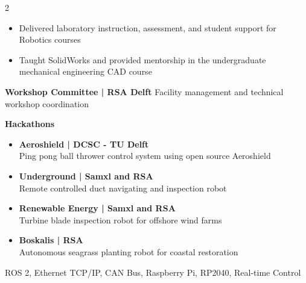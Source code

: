 \documentclass[9pt, a4paper, withhyper, normalphoto]{altacv}
\begin{document}
\begin{paracol}{2}
    \medskip
    \divider
    
      \begin{itemize}
          \item Delivered laboratory instruction, assessment, and student support for Robotics courses
          \item Taught SolidWorks and provided mentorship in the undergraduate mechanical engineering CAD course
      \end{itemize}
    
    \medskip
    \divider
    
    \switchcolumn
    


    \medskip


    

    \textbf{Workshop Committee | RSA Delft}{}
    Facility management and technical workshop coordination

    \divider

    \textbf{Hackathons}{}
     \begin{itemize}
      \item \textbf{Aeroshield | DCSC - TU Delft}\\
      Ping pong ball thrower control system using open source Aeroshield
      \item \textbf{Underground | Samxl and RSA}\\
      Remote controlled duct navigating and inspection robot
      \item \textbf{Renewable Energy | Samxl and RSA}\\
      Turbine blade inspection robot for offshore wind farms
      \item \textbf{Boskalis | RSA}\\
      Autonomous seagrass planting robot for coastal restoration
    \end{itemize}
    
    
    
    ROS 2, Ethernet TCP/IP, CAN Bus, Raspberry Pi, RP2040, Real-time Control
    

\end{paracol}
\end{document}
